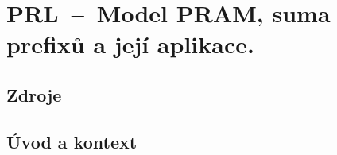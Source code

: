 

\graphicspath{{prl/model_pram/figures}}


\chapter{PRL~--~Model PRAM, suma prefixů a její aplikace.}


\section{Zdroje}

\begin{compactitem}
    \item {}
\end{compactitem}


\section{Úvod a kontext}

\begin{compactitem}
    \item {}
\end{compactitem}
